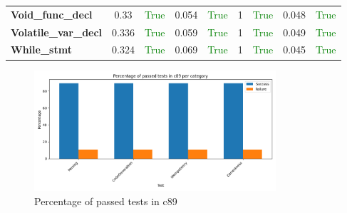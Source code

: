 \documentclass{article}
\begin{document}
\begin{xltabular}{\textwidth}{lcccccccc}
\textbf{{\fontsize{10}{12}\selectfont Void\_func\_decl}}& 0.33&\textcolor{green}{True}& 0.054&\textcolor{green}{True}& 1&\textcolor{green}{True}& 0.048&\textcolor{green}{True} \\[0.5ex]
\textbf{{\fontsize{10}{12}\selectfont Volatile\_var\_decl}}& 0.336&\textcolor{green}{True}& 0.059&\textcolor{green}{True}& 1&\textcolor{green}{True}& 0.049&\textcolor{green}{True} \\[0.5ex]
\textbf{{\fontsize{10}{12}\selectfont While\_stmt}}& 0.324&\textcolor{green}{True}& 0.069&\textcolor{green}{True}& 1&\textcolor{green}{True}& 0.045&\textcolor{green}{True} \\[0.5ex]
\bottomrule
\end{xltabular}
\newpage
\begin{figure}[h!]
\centering
\includegraphics[width=0.8\textwidth]{../reports/clava/images/c89_percentage.png}
\caption{Percentage of passed tests in c89}
\label{fig:c89_percentage}
\end{figure}
\newpage
\end{document}
